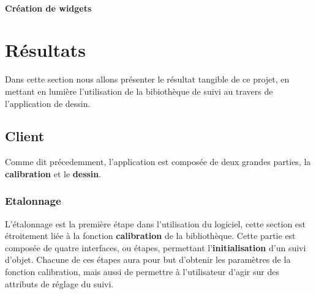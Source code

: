 \documentclass{report}
\begin{document}
			\subsubsection{Création de widgets}

	\chapter{Résultats}
		Dans cette section nous allons présenter le résultat tangible de ce projet, en mettant en lumière l'utilisation de la bibiothèque de suivi au travers de l'application de dessin.
		
		
			
		
		\section{Client}
			Comme dit précedemment, l'application est composée de deux grandes parties, la \textbf{calibration} et le \textbf{dessin}.
			\subsection{Etalonnage}
				L'étalonnage est la première étape dans l'utilisation du logiciel, cette section est étroitement liée à la fonction \textbf{calibration} de la bibliothèque. Cette partie est composée de quatre interfaces, ou étapes, permettant l'\textbf{initialisation} d'un suivi d'objet. Chacune de ces étapes aura pour but d'obtenir les paramètres de la fonction calibration, mais aussi de permettre à l'utilisateur d'agir sur des attributs de réglage du suivi.
				\newpage
\end{document}
